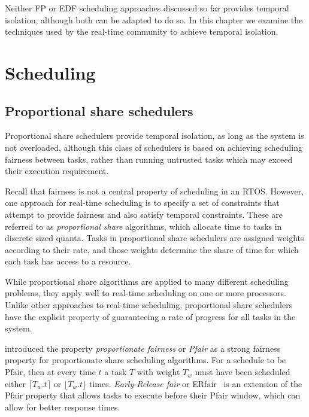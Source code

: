 Neither \gls{FP} or \gls{EDF} scheduling
approaches discussed so far provides temporal isolation, although both can be adapted to do so.  In
this chapter we examine the techniques used by the real-time community to achieve temporal
isolation.


\section{Scheduling}


\subsection{Proportional share schedulers}

Proportional share schedulers provide temporal isolation, as long as the system is not overloaded,
although this class of schedulers is based on achieving scheduling fairness between tasks, rather
than running untrusted tasks which may exceed their execution requirement. 

Recall that fairness is not a central property of scheduling in an \gls{RTOS}. However, one approach
for real-time scheduling is to specify a set of constraints that attempt to provide fairness and
also satisfy temporal constraints.  These are referred to as \emph{proportional share} algorithms,
which allocate time to tasks in discrete sized quanta. Tasks in proportional share schedulers are assigned 
weights according to their rate, and those weights determine the share of time for which each task 
has access to a resource.

While proportional share algorithms are applied to many different scheduling problems, they apply
well to real-time scheduling on one or more processors.
Unlike other approaches to real-time scheduling, proportional share schedulers have the explicit property of guaranteeing a rate of progress for all tasks in the system.

\citet{Baruah_CPV_96} introduced the property \emph{proportionate fairness} or \emph{Pfair} as a
strong fairness property for proportionate share scheduling algorithms.  For a schedule to be Pfair,
then at every time $t$ a task $T$ with weight $T_{w}$ must have been scheduled either $\lceil T_{w}
. t \rceil$ or $\lfloor T_{w}.t \rfloor $ times.  \emph{Early-Release fair} or
ERfair~\citep{Anderson_Srinivasan_04} is an extension of the Pfair property that allows tasks to
execute before their Pfair window, which can allow for better response times.

